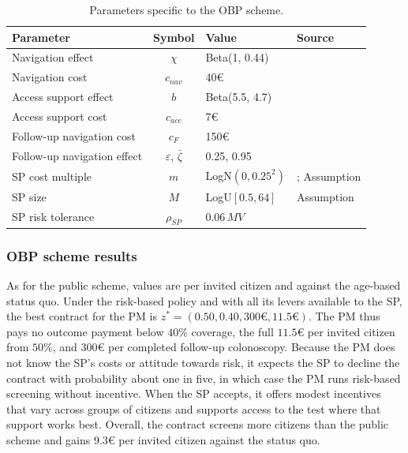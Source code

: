 \documentclass[12pt]{article}
\begin{document}
\begin{table}[htbp]
\centering
\footnotesize
\caption{Parameters specific to the OBP scheme.}
\label{tab:obp_params}
\begin{tabular}{l c l l}
\toprule
\textbf{Parameter} & \textbf{Symbol} & \textbf{Value} & \textbf{Source} \\
\midrule
Navigation effect & $\chi$ & Beta(1, 0.44) & \citealp{ramai2026} \\
Navigation cost & $c_{nav}$ & 40€ & \citealp{demil2018} \\
Access support effect & $b$ & Beta(5.5, 4.7) & \citealp{piette2017} \\
Access support cost & $c_{acc}$ & 7€ & \citealp{arrospide2018cost} \\
Follow-up navigation cost & $c_F$ & 150€ & \citealp{reynolds2025increasing} \\
Follow-up navigation effect & $\varepsilon$, $\bar\zeta$ & 0.25, 0.95 & \citealp{coronado2025, chua2026} \\
SP cost multiple & $m$ & LogN$(0, 0.25^2)$ & \citealp{bel2010private}; Assumption \\
SP size & $M$ & LogU$[0.5, 64]$ & Assumption \\
SP risk tolerance & $\rho_{SP}$ & $0.06\, M V$ & \citealp{howard1988} \\
\bottomrule
\end{tabular}
\end{table}



\subsubsection{OBP scheme results}\label{sec:obp_scheme_results}
As for the public scheme, values are per invited citizen and against the age-based status quo. Under the risk-based policy and with all its levers available to the SP, the best contract for the PM is $z^* = (0.50, 0.40, 300\text{€}, 11.5\text{€})$. The PM thus pays no outcome payment below $40\%$ coverage, the full $11.5$€ per invited citizen from $50\%$, and $300$€ per completed follow-up colonoscopy. Because the PM does not know the SP's costs or attitude towards risk, it expects the SP to decline the contract with probability about one in five, in which case the PM runs risk-based screening without incentive. When the SP accepts, it offers modest incentives that vary across groups of citizens and supports access to the test where that support works best. Overall, the contract screens more citizens than the public scheme and gains 9.3€ per invited citizen against the status quo.
\end{document}
